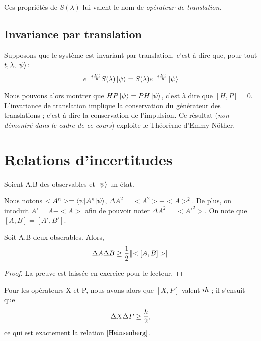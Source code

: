 \documentclass[../Notesdecours.tex]{subfiles}
\begin{document}
Ces propriétés de $S(\lambda)$ lui valent le nom de \emph{opérateur de translation}.

\subsection{Invariance par translation}
Supposons que le système est invariant par translation, c'est à dire que, pour tout $t,\lambda,\ket{\psi}$:
\begin{equation}
	e^{-i\frac{Ht}{\hbar}}S(\lambda)\ket{\psi} = S(\lambda)e^{-i\frac{Ht}{\hbar}}\ket{\psi}
\end{equation}

Nous pouvons alors montrer que $HP\ket{\psi} = PH\ket{\psi}$, c'est à dire que $[H,P] = 0$.\\

L'invariance de translation implique la conservation du générateur des translations ; c'est à dire la conservation de l'impulsion. Ce résultat (\emph{non démontré dans le cadre de ce cours}) exploite le Théorème d'Emmy Nöther.

\section{Relations d'incertitudes}
Soient A,B des observables et $\ket{\psi}$ un état.

\begin{remark}
	Nous notons $<A^n> = \braket{\psi|A^n|\psi}$, $\Delta A^2 = <A^2> - <A>^2$. De plus, on intoduit $A' = A-<A>$ afin de pouvoir noter $\Delta A^2 = <A'^2>$. On note que $[A,B] = [A',B']$.
\end{remark}

\begin{theorem}
	Soit A,B deux obserables. Alors,
	\begin{equation}
		\Delta A\Delta B \geq \frac{1}{2} \norm{<[A,B]>}
	\end{equation}
\end{theorem}

\begin{proof}
	La preuve est laissée en exercice pour le lecteur.
\end{proof}

Pour les opérateurs X et P, nous avons alors que $[X,P]$ valent $i\hbar$ ; il s'ensuit que
\begin{equation*}
	\Delta X \Delta P \geq \frac{\hbar}{2},
\end{equation*}
ce qui est exactement la relation $\eqref{Heinsenberg}$.
\end{document}

